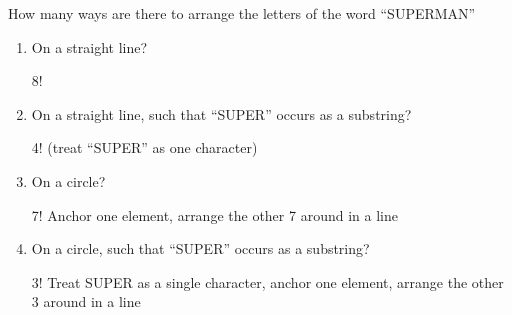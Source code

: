 \question How many ways are there to arrange the letters of the word 
“SUPERMAN”
\begin{enumerate}[label=(\alph*)]
 \item On a straight line?
\begin{solution} 8! \end{solution}

\item On a straight line, such that “SUPER” occurs as a substring?
\begin{solution} 4! (treat “SUPER” as one character) \end{solution}

\item On a circle? 
\begin{solution} 7! Anchor one element, arrange the other 7 around in a line
 \end{solution}

\item On a circle, such that “SUPER” occurs as a substring?
\begin{solution} [2 mm] 3!
Treat SUPER as a single character, anchor one element, arrange the other 3 around in 
a line  \end{solution}

\end{enumerate}